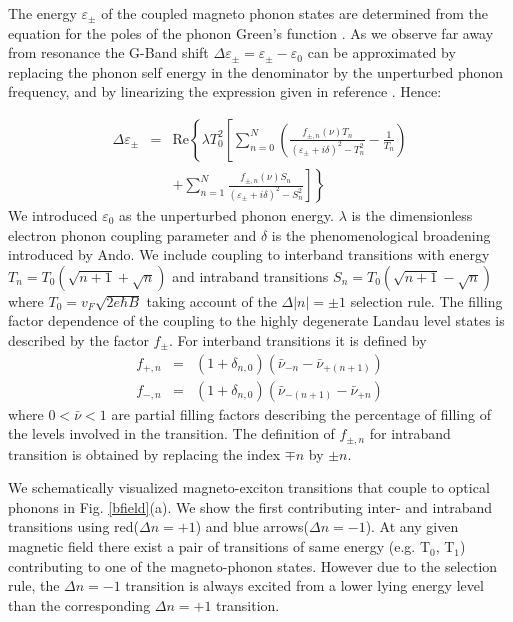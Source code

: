 \documentclass[prl,aps,superscriptaddress,showpacs,reprint]{revtex4-1}
\begin{document}
The energy $\varepsilon_{\pm}$ of the coupled magneto phonon states are determined from the equation for the poles of the phonon Green’s function \cite{goerbig2007filling,ando2007magnetic,kossacki2012circular}. As we observe far away from resonance the G-Band shift $\Delta\varepsilon_{\pm} = \varepsilon_{\pm} - \varepsilon_0$ can be approximated by replacing the phonon self energy in the denominator by the unperturbed phonon frequency, and by linearizing the expression given in reference \cite{kossacki2012circular}. Hence:

\begin{eqnarray}
\label{greens}
\Delta\varepsilon_{\pm} &=& \mathrm{Re}\left\lbrace \lambda T_0^2 \left[ \sum_{n=0}^N\left(\frac{f_{\pm,n}\left(\nu\right) T_n}{\left(\varepsilon_{\pm}+i\delta\right)^2-T_n^2}-\frac{1}{T_n}\right)\right.\right.\nonumber \\
& &\left.\left. +\sum_{n=1}^{N}\frac{f_{\pm,n}\left(\nu\right) S_n}{\left(\varepsilon_{\pm}+i\delta\right)^2-S_n^2}\right]\right\rbrace
\end{eqnarray}
We introduced $\varepsilon_0$ as the unperturbed phonon energy. $\lambda$ is the dimensionless electron phonon coupling parameter and $\delta$ is the phenomenological broadening introduced by Ando\cite{ando2007magnetic}. We include coupling to interband transitions with energy $T_n=T_0\left(\sqrt{n+1}+\sqrt{n}\right)$ and intraband transitions $S_n=T_0\left(\sqrt{n+1}-\sqrt{n}\right)$ where $T_0=v_F\sqrt{2e\hbar B}$ taking account of the $\Delta\left|n\right|=\pm 1$ selection rule. The filling factor dependence of the coupling to the highly degenerate Landau level states is described by the factor $f_{\pm}$. For interband transitions it is defined by
\begin{eqnarray}
\label{fterm}
f_{+,n}&=&(1+\delta_{n,0})(\bar{\nu}_{-n}-\bar{\nu}_{+(n+1)})\nonumber\\
f_{-,n}&=&(1+\delta_{n,0})(\bar{\nu}_{-(n+1)}-\bar{\nu}_{+n})
\end{eqnarray}
where $0<\bar{\nu}<1$ are partial filling factors describing the percentage of filling of the levels involved in the transition. The definition of $f_{\pm ,n}$ for intraband transition is obtained by replacing the index $\mp n$ by $\pm n$.

We schematically visualized magneto-exciton transitions that couple to optical phonons in Fig. \ref{bfield}(a). We show the first contributing inter- and intraband transitions using red($\Delta n = +1$) and blue arrows($\Delta n = -1$). At any given magnetic field there exist a pair of transitions of same energy (e.g. T$_0$, T$_1$) contributing to one of the magneto-phonon states. However due to the selection rule, the $\Delta n = -1$ transition is always excited from a lower lying energy level than the corresponding $\Delta n = +1$ transition. 
\end{document}
